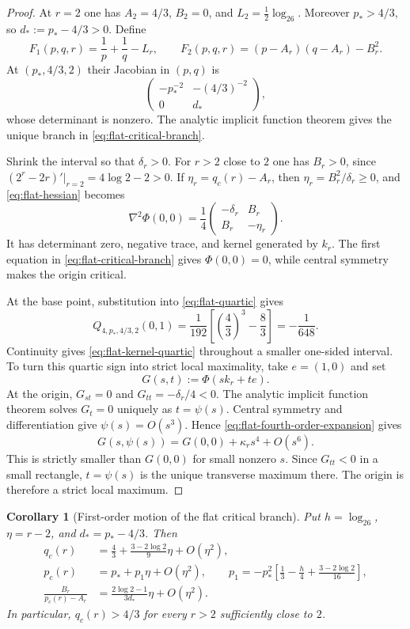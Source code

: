 \documentclass[11pt,reqno]{amsart}
\numberwithin{equation}{section}
\newtheorem{corollary}[corollary]{Corollary}
\theoremstyle{definition}
\theoremstyle{remark}
\newcommand{\logtwo}{\log_2}
\begin{document}
\begin{proof}
At $r=2$ one has $A_2=4/3$, $B_2=0$, and
$L_2=\frac12\logtwo6$.  Moreover
$p_*>4/3$, so $d_*:=p_*-4/3>0$.  Define
\[
  F_1(p,q,r)=\frac1p+\frac1q-L_r,
  \qquad
  F_2(p,q,r)=(p-A_r)(q-A_r)-B_r^2.
\]
At $(p_*,4/3,2)$ their Jacobian in $(p,q)$ is
\[
  \begin{pmatrix}
    -p_*^{-2}&-(4/3)^{-2}\\
    0&d_*
  \end{pmatrix},
\]
whose determinant is nonzero.  The analytic implicit function theorem gives
the unique branch in \eqref{eq:flat-critical-branch}.

Shrink the interval so that $\delta_r>0$.  For $r>2$ close to $2$ one has
$B_r>0$, since $(2^r-2r)'|_{r=2}=4\log2-2>0$.  If
$\eta_r=q_c(r)-A_r$, then
$\eta_r=B_r^2/\delta_r\ge0$, and \eqref{eq:flat-hessian} becomes
\[
  \nabla^2\Phi(0,0)
  =\frac14
  \begin{pmatrix}
    -\delta_r&B_r\\
    B_r&-\eta_r
  \end{pmatrix}.
\]
It has determinant zero, negative trace, and kernel generated by $k_r$.  The
first equation in \eqref{eq:flat-critical-branch} gives
$\Phi(0,0)=0$, while central symmetry makes the origin critical.

At the base point, substitution into \eqref{eq:flat-quartic} gives
\[
  Q_{4,p_*,4/3,2}(0,1)
  =\frac1{192}\left[\left(\frac43\right)^3-\frac83\right]
  =-\frac1{648}.
\]
Continuity gives \eqref{eq:flat-kernel-quartic} throughout a smaller
one-sided interval.  To turn this quartic sign into strict local maximality,
take $e=(1,0)$ and set
\[
  G(s,t):=\Phi(sk_r+te).
\]
At the origin, $G_{st}=0$ and $G_{tt}=-\delta_r/4<0$.  The analytic implicit
function theorem solves $G_t=0$ uniquely as $t=\psi(s)$.  Central symmetry
and differentiation give $\psi(s)=O(s^3)$.  Hence
\eqref{eq:flat-fourth-order-expansion} gives
\[
  G(s,\psi(s))=G(0,0)+\kappa_rs^4+O(s^6).
\]
This is strictly smaller than $G(0,0)$ for small nonzero $s$.  Since
$G_{tt}<0$ in a small rectangle, $t=\psi(s)$ is the unique transverse maximum
there.  The origin is therefore a strict local maximum.
\end{proof}

\begin{corollary}[First-order motion of the flat critical branch]
\label{cor:flat-branch-motion}
Put $h=\logtwo6$, $\eta=r-2$, and $d_*=p_*-4/3$.  Then
\begin{align}
  q_c(r)
  &=\frac43+\frac{3-2\log2}{9}\eta+O(\eta^2),
  \label{eq:qc-motion}\\
  p_c(r)
  &=p_*+p_1\eta+O(\eta^2),
  \qquad
  p_1=-p_*^2\left[
    \frac13-\frac h4+\frac{3-2\log2}{16}
  \right],
  \label{eq:pc-motion}\\
  \frac{B_r}{p_c(r)-A_r}
  &=\frac{2\log2-1}{3d_*}\eta+O(\eta^2).
  \label{eq:kernel-motion}
\end{align}
In particular, $q_c(r)>4/3$ for every $r>2$ sufficiently close to $2$.
\end{corollary}
\end{document}
